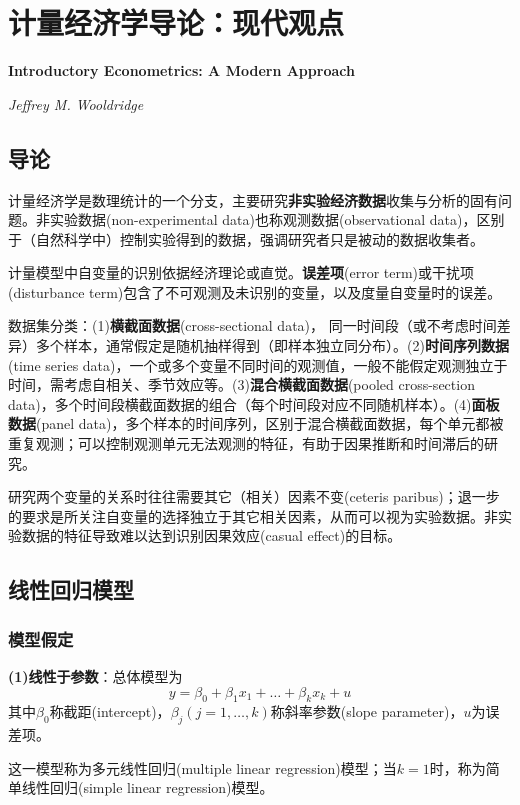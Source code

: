 \chapter{计量经济学导论：现代观点}
\Large\textbf{Introductory Econometrics: A Modern Approach}
\par \emph{Jeffrey M. Wooldridge} \normalsize

\section{导论}

\par 计量经济学是数理统计的一个分支，主要研究\textbf{非实验经济数据}收集与分析的固有问题。非实验数据(non-experimental data)也称观测数据(observational data)，区别于（自然科学中）控制实验得到的数据，强调研究者只是被动的数据收集者。

\par 计量模型中自变量的识别依据经济理论或直觉。\textbf{误差项}(error term)或干扰项(disturbance term)包含了不可观测及未识别的变量，以及度量自变量时的误差。

\par 数据集分类：(1)\textbf{横截面数据}(cross-sectional data)， 同一时间段（或不考虑时间差异）多个样本，通常假定是随机抽样得到（即样本独立同分布）。(2)\textbf{时间序列数据}(time series data)，一个或多个变量不同时间的观测值，一般不能假定观测独立于时间，需考虑自相关、季节效应等。(3)\textbf{混合横截面数据}(pooled cross-section data)，多个时间段横截面数据的组合（每个时间段对应不同随机样本）。(4)\textbf{面板数据}(panel data)，多个样本的时间序列，区别于混合横截面数据，每个单元都被重复观测；可以控制观测单元无法观测的特征，有助于因果推断和时间滞后的研究。

\par 研究两个变量的关系时往往需要其它（相关）因素不变(ceteris paribus)；退一步的要求是所关注自变量的选择独立于其它相关因素，从而可以视为实验数据。非实验数据的特征导致难以达到识别因果效应(casual effect)的目标。

\section{线性回归模型}

\subsection{模型假定}
\par \textbf{(1)线性于参数}：总体模型为
\begin{equation}
    y=\beta_0+\beta_1 x_1+\dots+\beta_k x_k +u
\end{equation}
其中$\beta_0$称截距(intercept)，$\beta_j(j=1,\dots,k)$称斜率参数(slope parameter)，$u$为误差项。
\par 这一模型称为多元线性回归(multiple linear regression)模型；当$k=1$时，称为简单线性回归(simple linear regression)模型。

